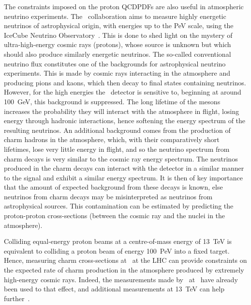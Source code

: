 The constraints imposed on the proton \acp{QCDPDF} are also useful in 
atmospheric neutrino experiments.
The \icecube\ collaboration aims to measure highly energetic neutrinos of 
astrophysical origin, with energies up to the \si{\peta\eV} scale, using the 
IceCube Neutrino Observatory~\cite{Achterberg:2006md}.
This is done to shed light on the mystery of ultra-high-energy cosmic rays 
(protons), whose source is unknown but which should also produce similarly 
energetic neutrinos.
The so-called conventional neutrino flux constitutes one of the backgrounds for 
astrophysical neutrino experiments.
This is made by cosmic rays interacting in the atmosphere and producing pions 
and kaons, which then decay to final states containing neutrinos.
However, for the high energies the \icecube\ detector is sensitive to, 
beginning at around \SI{100}{\GeV}, this background is suppressed.
The long lifetime of the mesons increases the probability they will interact 
with the atmosphere in flight, losing energy through hadronic interactions, 
hence softening the energy spectrum of the resulting neutrinos.
An additional background comes from the production of charm hadrons in the 
atmosphere, which, with their comparatively short lifetimes, lose very little 
energy in flight, and so the neutrino spectrum from charm decays is very 
similar to the cosmic ray energy spectrum.
The neutrinos produced in the charm decays can interact with the detector in a 
similar manner to the signal and exhibit a similar energy spectrum.
It is then of key importance that the amount of expected background from these 
decays is known, else neutrinos from charm decays may be misinterpreted as 
neutrinos from astrophysical sources.
This contamination can be estimated by predicting the proton-proton 
cross-sections (between the cosmic ray and the nuclei in the atmosphere).

Colliding equal-energy proton beams at a centre-of-mass energy of \SI{13}{\TeV} 
is equivalent to colliding a proton beam of energy \SI{100}{\peta\eV} into a 
fixed target.
Hence, measuring charm cross-sections at \ at the \ac{LHC} can 
provide constraints on the expected rate of charm production in the atmosphere 
produced by extremely high-energy cosmic rays.
Indeed, the measurements made by \lhcb\ at \ have already been used 
to that effect, and additional measurements at \SI{13}{\TeV} can help 
further~\cite{Gauld:2015yia,Bhattacharya:2015jpa}.

